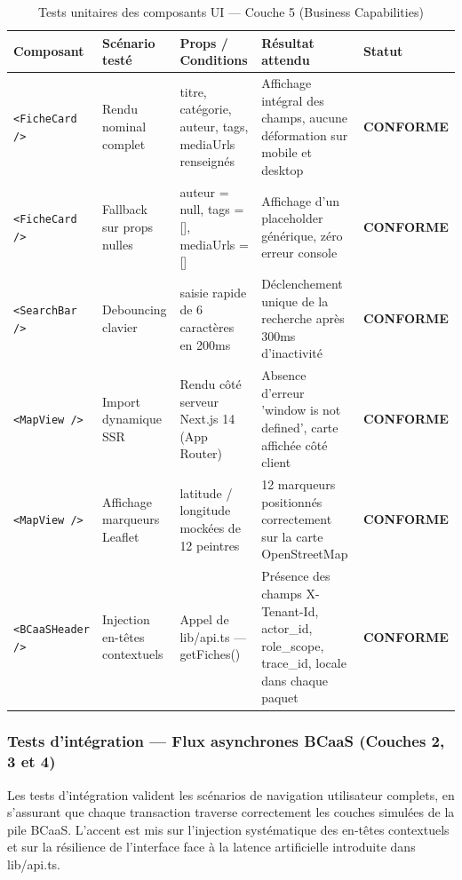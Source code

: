 \documentclass[12pt,a4paper]{report}
\begin{document}
\begin{table}[H]
\centering
\caption{Tests unitaires des composants UI --- Couche 5 (Business Capabilities)}
\label{tab:unit_tests}
\renewcommand{\arraystretch}{1.4}
\small
\begin{tabular}{|p{}|p{}|p{}|p{}|p{}|}
\hline
\textbf{Composant} & \textbf{Scénario testé} & \textbf{Props / Conditions} & \textbf{Résultat attendu} & \textbf{Statut} \\
\hline
\texttt{<FicheCard />} & Rendu nominal complet & titre, catégorie, auteur, tags, mediaUrls renseignés & Affichage intégral des champs, aucune déformation sur mobile et desktop & \textbf{CONFORME} \\
\hline
\texttt{<FicheCard />} & Fallback sur props nulles & auteur = null, tags = [], mediaUrls = [] & Affichage d'un placeholder générique, zéro erreur console & \textbf{CONFORME} \\
\hline
\texttt{<SearchBar />} & Debouncing clavier & saisie rapide de 6 caractères en 200ms & Déclenchement unique de la recherche après 300ms d'inactivité & \textbf{CONFORME} \\
\hline
\texttt{<MapView />} & Import dynamique SSR & Rendu côté serveur Next.js 14 (App Router) & Absence d'erreur 'window is not defined', carte affichée côté client & \textbf{CONFORME} \\
\hline
\texttt{<MapView />} & Affichage marqueurs Leaflet & latitude / longitude mockées de 12 peintres & 12 marqueurs positionnés correctement sur la carte OpenStreetMap & \textbf{CONFORME} \\
\hline
\texttt{<BCaaSHeader />} & Injection en-têtes contextuels & Appel de lib/api.ts --- getFiches() & Présence des champs X-Tenant-Id, actor\_id, role\_scope, trace\_id, locale dans chaque paquet & \textbf{CONFORME} \\
\hline
\end{tabular}
\end{table}

\subsubsection*{Tests d'intégration --- Flux asynchrones BCaaS (Couches 2, 3 et 4)}

Les tests d'intégration valident les scénarios de navigation utilisateur complets, en s'assurant que chaque transaction traverse correctement les couches simulées de la pile BCaaS. L'accent est mis sur l'injection systématique des en-têtes contextuels et sur la résilience de l'interface face à la latence artificielle introduite dans lib/api.ts.
\end{document}
